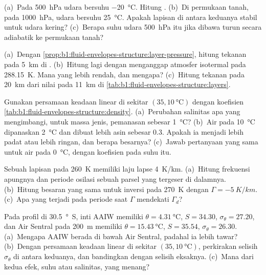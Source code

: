 \begin{exercise}[$\star\star$]\label{exo:b1:fluid-envelopes-structure:5}
(a)~Pada \qty{500}{hPa} udara bersuhu \qty{-20}{\celsius}. Hitung .
(b)~Di permukaan tanah, pada \qty{1000}{hPa}, udara bersuhu \qty{25}{\celsius}. Apakah
lapisan di antara keduanya stabil untuk udara kering? (c)~Berapa suhu udara
\qty{500}{hPa} itu jika dibawa turun secara adiabatik ke permukaan tanah?
\end{exercise}

\begin{exercise}[$\star\star$]\label{exo:b1:fluid-envelopes-structure:6}
(a)~Dengan \cref{prop:b1:fluid-envelopes-structure:layer-pressure}, hitung tekanan
pada \qty{5}{km} di . (b)~Hitung lagi dengan menganggap atmosfer
isotermal pada \qty{288.15}{K}. Mana yang lebih rendah, dan mengapa? (c)~Hitung
tekanan pada \qty{20}{km} dari nilai pada \qty{11}{km} di
\cref{tab:b1:fluid-envelopes-structure:layers}.
\end{exercise}

\begin{exercise}[$\star\star$]\label{exo:b1:fluid-envelopes-structure:7}
Gunakan persamaan keadaan linear di sekitar $(35, \qty{10}{\celsius})$ dengan
koefisien \cref{tab:b1:fluid-envelopes-structure:density}. (a)~Perubahan salinitas apa
yang mengimbangi, untuk massa jenis, pemanasan sebesar \qty{1}{\celsius}? (b)~Air pada
\qty{10}{\celsius} dipanaskan \qty{2}{\celsius} dan dibuat lebih asin sebesar
\num{0.3}. Apakah ia menjadi lebih padat atau lebih ringan, dan berapa besarnya?
(c)~Jawab pertanyaan yang sama untuk air pada \qty{0}{\celsius}, dengan koefisien pada
suhu itu.
\end{exercise}

\begin{exercise}[$\star\star$]\label{exo:b1:fluid-envelopes-structure:8}
Sebuah lapisan pada \qty{260}{K} memiliki laju lapse \qty{4}{K/km}. (a)~Hitung frekuensi
apungnya dan periode osilasi sebuah parsel yang tergeser di dalamnya. (b)~Hitung
besaran yang sama untuk inversi pada \qty{270}{K} dengan $\Gamma = \qty{-5}{K/km}$.
(c)~Apa yang terjadi pada periode saat $\Gamma$ mendekati $\Gamma_d$?
\end{exercise}

\begin{exercise}[$\star\star$]\label{exo:b1:fluid-envelopes-structure:9}
Pada profil di \qty{30.5}{\degree S}, inti AAIW memiliki $\theta =
\qty{4.31}{\celsius}$, $S = 34.30$, $\sigma_\theta = 27.20$, dan Air Sentral pada
\qty{200}{m} memiliki $\theta = \qty{15.43}{\celsius}$, $S = 35.54$,
$\sigma_\theta = 26.30$. (a)~Mengapa AAIW berada di bawah Air Sentral, padahal ia lebih tawar? (b)~Dengan
persamaan keadaan linear di sekitar $(35, \qty{10}{\celsius})$, perkirakan selisih
$\sigma_\theta$ di antara keduanya, dan bandingkan dengan selisih eksaknya. (c)~Mana
dari kedua efek, suhu atau salinitas, yang menang?
\end{exercise}

